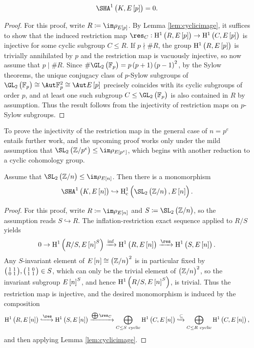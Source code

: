 \pagebreak

\begin{proposition}
\label{prop:vanishingbase}
$$ \Sha[K, E\sbr{p}] = 0. $$
\end{proposition}

\begin{proof}
For this proof, write $ R \coloneqq \im \rho_{E\sbr{p}} $. By Lemma \ref{lem:cyclicimage}, it suffices to show that the induced restriction map $ \res_C : \HE[p]{R} \to \HE[p]{C} $ is injective for some cyclic subgroup $ C \le R $. If $ p \nmid \#R $, the group $ \HE[p]{R} $ is trivially annihilated by $ p $ and the restriction map is vacuously injective, so now assume that $ p \mid \#R $. Since $ \#\GL_2\br{\FF_p} = p\br{p + 1}\br{p - 1}^2 $, by the Sylow theorems, the unique conjugacy class of $ p $-Sylow subgroups of $ \GL_2\br{\FF_p} \cong \Aut \FF_p^2 \cong \Aut E\sbr{p} $ precisely coincides with its cyclic subgroups of order $ p $, and at least one such subgroup $ C \le \GL_2\br{\FF_p} $ is also contained in $ R $ by assumption. Thus the result follows from the injectivity of restriction maps on $ p $-Sylow subgroups.
\end{proof}

To prove the injectivity of the restriction map in the general case of $ n = p^e $ entails further work, and the upcoming proof works only under the mild assumption that $ \SL_2\br{\ZZ / p^e} \le \im \rho_{E\sbr{p^e}} $, which begins with another reduction to a cyclic cohomology group.

\begin{lemma}
\label{lem:cyclicspecial}
Assume that $ \SL_2\br{\ZZ / n} \le \im \rho_{E\sbr{n}} $. Then there is a monomorphism
$$ \Sha[K, E\sbr{n}] \hookrightarrow \H_\c^1\br{\SL_2\br{\ZZ / n}, E\sbr{n}}. $$
\end{lemma}

\begin{proof}
For this proof, write $ R \coloneqq \im \rho_{E\sbr{n}} $ and $ S \coloneqq \SL_2\br{\ZZ / n} $, so the assumption reads $ S \hookrightarrow R $. The inflation-restriction exact sequence applied to $ R / S $ yields
$$ 0 \to \H^1\br{R / S, E\sbr{n}^S} \xrightarrow{\inf} \HE[n]{R} \xrightarrow{\res} \HE[n]{S}. $$
Any $ S $-invariant element of $ E\sbr{n} \cong \br{\ZZ / n}^2 $ is in particular fixed by $ \begin{psmallmatrix} 1 & 1 \\ 0 & 1 \end{psmallmatrix}, \begin{psmallmatrix} 1 & 0 \\ 1 & 1 \end{psmallmatrix} \in S $, which can only be the trivial element of $ \br{\ZZ / n}^2 $, so the invariant subgroup $ E\sbr{n}^S $, and hence $ \H^1\br{R / S, E\sbr{n}^S} $, is trivial. Thus the restriction map is injective, and the desired monomorphism is induced by the composition
$$ \HE[n]{R} \xhookrightarrow{\res} \HE[n]{S} \xrightarrow{\bigoplus \res_C} \bigoplus_{C \le S \ \text{cyclic}} \HE[n]{C} \xhookrightarrow{\subseteq} \bigoplus_{C \le R \ \text{cyclic}} \HE[n]{C}, $$
and then applying Lemma \ref{lem:cyclicimage}.
\end{proof}

